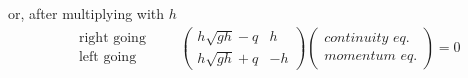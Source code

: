 or, after multiplying with $h$
\begin{align}
    \begin{matrix}
    \quad \text{right going} \\
    \quad \text{left going}
\end{matrix}
\qquad
    \begin{pmatrix}
        h\sqrt{gh} - q  &  h \\
        h\sqrt{gh} + q  &  -h
    \end{pmatrix}
    \begin{pmatrix} \textit{continuity eq.} \\ \textit{momentum eq.} \end{pmatrix}    = 0
\end{align}
